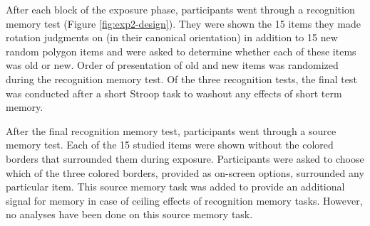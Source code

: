 After each block of the exposure phase, participants went through a recognition memory test (Figure \ref{fig:exp2-design}). They were shown the 15 items they made rotation judgments on (in their canonical orientation) in addition to 15 new random polygon items and were asked to determine whether each of these items was old or new. Order of presentation of old and new items was randomized during the recognition memory test. Of the three recognition tests, the final test was conducted after a short Stroop task to washout any effects of short term memory. 

After the final recognition memory test, participants went through a source memory test. Each of the 15 studied items were shown without the colored borders that surrounded them during exposure. Participants were asked to choose which of the three colored borders, provided as on-screen options, surrounded any particular item. This source memory task was added to provide an additional signal for memory in case of ceiling effects of recognition memory tasks. However, no analyses have been done on this source memory task. 


